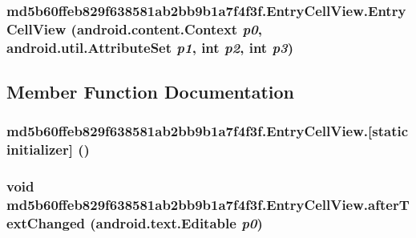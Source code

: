 \hypertarget{classmd5b60ffeb829f638581ab2bb9b1a7f4f3f_1_1_entry_cell_view_14a969f0bee94c6d0e466e8556927658}{
\subsubsection[{EntryCellView}]{\setlength{\rightskip}{0pt plus 5cm}md5b60ffeb829f638581ab2bb9b1a7f4f3f.EntryCellView.EntryCellView (android.content.Context {\em p0}, \/  android.util.AttributeSet {\em p1}, \/  int {\em p2}, \/  int {\em p3})}}
\label{classmd5b60ffeb829f638581ab2bb9b1a7f4f3f_1_1_entry_cell_view_14a969f0bee94c6d0e466e8556927658}




\subsection{Member Function Documentation}
\hypertarget{classmd5b60ffeb829f638581ab2bb9b1a7f4f3f_1_1_entry_cell_view_c5195e962af41644714b2efc9306742e}{
\subsubsection[{[static initializer]}]{\setlength{\rightskip}{0pt plus 5cm}md5b60ffeb829f638581ab2bb9b1a7f4f3f.EntryCellView.\mbox{[}static initializer\mbox{]} ()}}
\label{classmd5b60ffeb829f638581ab2bb9b1a7f4f3f_1_1_entry_cell_view_c5195e962af41644714b2efc9306742e}


\hypertarget{classmd5b60ffeb829f638581ab2bb9b1a7f4f3f_1_1_entry_cell_view_62f9d563c0b08b8bd5ca59c1794f5ed0}{
\subsubsection[{afterTextChanged}]{\setlength{\rightskip}{0pt plus 5cm}void md5b60ffeb829f638581ab2bb9b1a7f4f3f.EntryCellView.afterTextChanged (android.text.Editable {\em p0})}}
\label{classmd5b60ffeb829f638581ab2bb9b1a7f4f3f_1_1_entry_cell_view_62f9d563c0b08b8bd5ca59c1794f5ed0}


